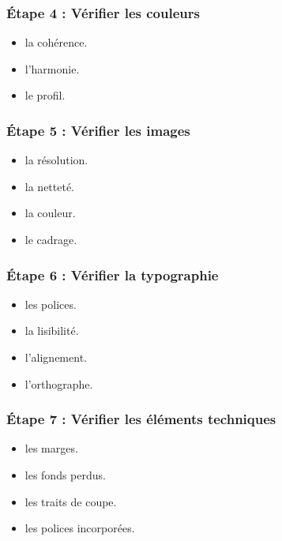 \subsubsection{Étape 4 : Vérifier les couleurs}

\begin{itemize}
    \item {} la cohérence.
    \item {} l'harmonie.
    \item {} le profil.
\end{itemize}

\subsubsection{Étape 5 : Vérifier les images}

\begin{itemize}
    \item {} la résolution.
    \item {} la netteté.
    \item {} la couleur.
    \item {} le cadrage.
\end{itemize}

\subsubsection{Étape 6 : Vérifier la typographie}

\begin{itemize}
    \item {} les polices.
    \item {} la lisibilité.
    \item {} l'alignement.
    \item {} l'orthographe.
\end{itemize}

\subsubsection{Étape 7 : Vérifier les éléments techniques}

\begin{itemize}
    \item {} les marges.
    \item {} les fonds perdus.
    \item {} les traits de coupe.
    \item {} les polices incorporées.
\end{itemize}

